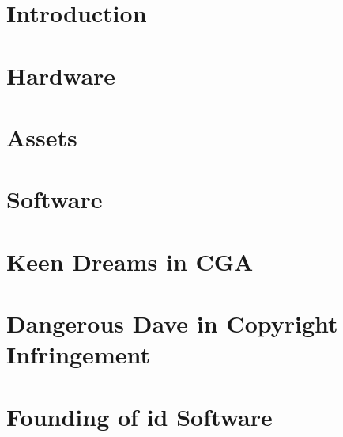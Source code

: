 \documentclass[8pt]{book}
\begin{document}
         

    \renewcommand{\rmdefault}{cmss} 
    \renewcommand{\familydefault}{\sfdefault}
    

    
    
    \cleardoublepage %
  

    \cleardoublepage %

    \setcounter{secnumdepth}{3} %
    
    
    
    
    \tableofcontents
    
    \pagebreak

	\chapter{Introduction}
      
    
  
    \chapter{Hardware}
      
      
    \chapter{Assets}
      
      
    \chapter{Software}
       
       
       
       
       
       
       
    \chapter{Keen Dreams in CGA}
       
       
    \appendix
    \appendixpage

	\chapter{Dangerous Dave in Copyright Infringement}
        
        
    \chapter{Founding of id Software}
        

  
    \cleartoleftpage
    \thispagestyle{plain} \blankpage
    \thispagestyle{plain} \blankpage
    \thispagestyle{plain} \blankpage
\end{document}
